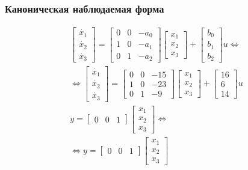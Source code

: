 \documentclass[a5paper, 10pt]{article}
\theoremstyle{definition}
\theoremstyle{plain}
\theoremstyle{remark}
\begin{document}
\subsubsection{Каноническая наблюдаемая форма}

\begin{multline}
\begin{bmatrix}
\dot{x_1}\\
\dot{x_2}\\
\dot{x_3}
\end{bmatrix}
=
\begin{bmatrix}
0 & 0 & -a_0\\
1 & 0 & -a_1\\
0 & 1 & -a_2
\end{bmatrix}
\begin{bmatrix}
x_1\\
x_2\\
x_3
\end{bmatrix}
+
\begin{bmatrix}
b_0\\
b_1\\
b_2
\end{bmatrix}
u \Leftrightarrow\\
 \Leftrightarrow
\begin{bmatrix}
\dot{x_1}\\
\dot{x_2}\\
\dot{x_3}
\end{bmatrix}
=
\begin{bmatrix}
0 & 0 & -15\\
1 & 0 & -23\\
0 & 1 & -9
\end{bmatrix}
\begin{bmatrix}
x_1\\
x_2\\
x_3
\end{bmatrix}
+
\begin{bmatrix}
16\\
6\\
14
\end{bmatrix}
u\\
y = 
\begin{bmatrix}
0 & 0 & 1
\end{bmatrix}
\begin{bmatrix}
x_1\\
x_2\\
x_3
\end{bmatrix} \Leftrightarrow\\
 \Leftrightarrow
y = 
\begin{bmatrix}
0 & 0 & 1
\end{bmatrix}
\begin{bmatrix}
x_1\\
x_2\\
x_3
\end{bmatrix} 
\end{multline}
\end{document}

